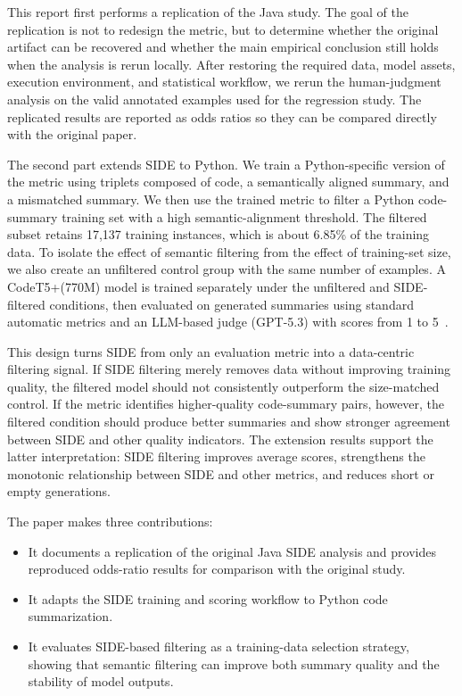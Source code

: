 \documentclass[conference]{IEEEtran}
\begin{document}
This report first performs a replication of the Java study. The goal of the replication is not to redesign the metric, but to determine whether the original artifact can be recovered and whether the main empirical conclusion still holds when the analysis is rerun locally. After restoring the required data, model assets, execution environment, and statistical workflow, we rerun the human-judgment analysis on the valid annotated examples used for the regression study. The replicated results are reported as odds ratios so they can be compared directly with the original paper.

The second part extends SIDE to Python. We train a Python-specific version of the metric using triplets composed of code, a semantically aligned summary, and a mismatched summary. We then use the trained metric to filter a Python code-summary training set with a high semantic-alignment threshold. The filtered subset retains 17,137 training instances, which is about 6.85\% of the training data. To isolate the effect of semantic filtering from the effect of training-set size, we also create an unfiltered control group with the same number of examples. A CodeT5+(770M) model is trained separately under the unfiltered and SIDE-filtered conditions, then evaluated on generated summaries using standard automatic metrics and an LLM-based judge (GPT-5.3) with scores from 1 to 5~\cite{feng2020codebert,guo2020graphcodebert,guo2021unixcoder,wang2021codet5,wang2023codet5,liu2023geval,zheng2023judging,wang2024large}.

This design turns SIDE from only an evaluation metric into a data-centric filtering signal. If SIDE filtering merely removes data without improving training quality, the filtered model should not consistently outperform the size-matched control. If the metric identifies higher-quality code-summary pairs, however, the filtered condition should produce better summaries and show stronger agreement between SIDE and other quality indicators. The extension results support the latter interpretation: SIDE filtering improves average scores, strengthens the monotonic relationship between SIDE and other metrics, and reduces short or empty generations.

The paper makes three contributions: 

\begin{itemize}
    \item It documents a replication of the original Java SIDE analysis and provides reproduced odds-ratio results for comparison with the original study.
    \item It adapts the SIDE training and scoring workflow to Python code summarization.
    \item It evaluates SIDE-based filtering as a training-data selection strategy, showing that semantic filtering can improve both summary quality and the stability of model outputs.
\end{itemize}
\end{document}
